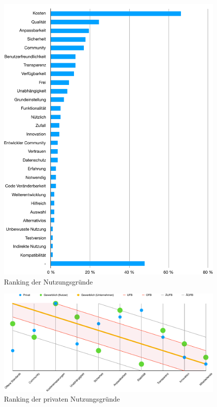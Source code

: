 \documentclass[a4paper]{article}
\begin{document}
                \begin{figure}
                    \includegraphics[width=\textwidth]{assets/results/freifeld/Freifeld.pdf}
                    \caption{Ranking der Nutzungsgründe}
                    \label{figure:usageRankingPrivate}
                \end{figure}    
                
            \begin{figure}
                \includegraphics[width=\textwidth]{assets/results/commercialReasoning/usageReasonRanking}
                \caption{Ranking der privaten Nutzungsgründe}
                \label{figure:usageRanking}
            \end{figure}
                
\end{document}
